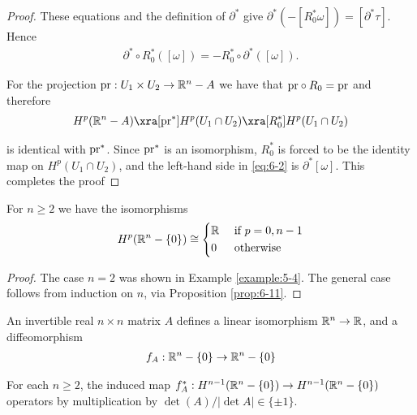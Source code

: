 \begin{proof}
These equations and the definition of $\partial^*$ give $\partial^*(-[R^*_0\omega]) = [\partial^*\tau]$. Hence 
\begin{align}\label{eq:6-2}
  \partial^*\circ R^*_0([\omega])
  = -R^*_0\circ\partial^*([\omega]).
\end{align}

For the projection $\mathrm{pr}:U_1\times U_2\to\mathbb{R}^n-A$ we have that $\mathrm{pr}\circ R_0 = \mathrm{pr}$ and therefore 
\begin{align*}
  H^p(\RR^n-A)\xra[\R{pr}^*]H^p(U_1\cap U_2)\xra[R^*_0] H^p(U_1\cap U_2)
\end{align*}

is identical with $\mathrm{pr}^*$. Since $\mathrm{pr}^*$ is an isomorphism, $R^*_0$ is forced to be the identity
map on $H^p(U_1\cap U_2)$, and the left-hand side in \eqref{eq:6-2} is $\partial^*[\omega]$. This completes the proof
\end{proof}

\begin{theorem}\label{theorem:6-13}
  For $n\ge 2$ we have the isomorphisms
  \begin{align*}
    H^p(\mathbb{R}^n -\{0\}) \cong \left\{\begin{aligned}
      & \mathbb{R} && \text{ if } p=0, n-1\\
      & 0 && \text{ otherwise}
    \end{aligned}\right.
  \end{align*}
\end{theorem}

\begin{proof}
  The case $n = 2$ was shown in Example \ref{example:5-4}. The general case follows
from induction on $n$, via Proposition \ref{prop:6-11}.
\end{proof}


An invertible real $n\times n$ matrix $A$ defines a linear isomorphism $\mathbb{R}^n\to\mathbb{R}$, and
a diffeomorphism
\begin{align*}
  f_A: \mathbb{R}^n-\{0\}\to \mathbb{R}^n-\{0\}
\end{align*}

\begin{lemma}\label{lemma:6-14}
  For each $n\ge 2$, the induced map $f^*_A:H^{n-1}(\mathbb{R}^n - \{0\})\to H^{n-1}(\mathbb{R}^n - \{0\})$ operators by 
  multiplication by $\det(A)/|\det A|\in \{\pm 1\}$.
\end{lemma}

